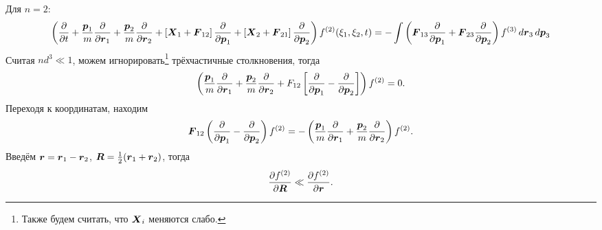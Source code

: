 Для $n=2$:
\begin{equation*}
	\left(
		\frac{\partial }{\partial t} + \frac{\boldsymbol{p}_1}{m} \frac{\partial }{\partial \boldsymbol{r}_1} + \frac{\boldsymbol{p}_2}{m} \frac{\partial }{\partial \boldsymbol{r}_2} + \left[
			\boldsymbol{X}_1 + \boldsymbol{F}_{12}
		\right] \frac{\partial }{\partial \boldsymbol{p}_1} + 
		\left[
			\boldsymbol{X}_2 + \boldsymbol{F}_{21}
		\right] \frac{\partial }{\partial \boldsymbol{p}_2} 
	\right) f^{(2)} (\xi_1, \xi_2, t) =  - \int \left(
		\boldsymbol{F}_{13} \frac{\partial }{\partial \boldsymbol{p}_1} + \boldsymbol{F}_{23} \frac{\partial }{\partial \boldsymbol{p}_2} 
	\right) f^{(3)} \, d \boldsymbol{r}_3 \, d \boldsymbol{p}_3
\end{equation*}
Считая $n d^3 \ll 1$, можем игнорировать\footnote{
	Также будем считать, что $\boldsymbol{X}_i$ меняются слабо. 
}  трёхчастичные столкновения, тогда
\begin{equation*}
	\left(
		\frac{\boldsymbol{p}_1}{m} \frac{\partial }{\partial \boldsymbol{r}_1} + \frac{\boldsymbol{p}_2}{m} \frac{\partial }{\partial \boldsymbol{r}_2} + F_{12} \left[\frac{\partial }{\partial \boldsymbol{p}_1} - \frac{\partial }{\partial \boldsymbol{p}_2} \right]
	\right) f^{(2)} = 0.
\end{equation*}
Переходя к координатам, находим
\begin{equation*}
	\boldsymbol{F}_{12} \left(\frac{\partial }{\partial \boldsymbol{p}_1} - \frac{\partial }{\partial \boldsymbol{p}_2}  \right) f^{(2)} = - \left(
		\frac{\boldsymbol{p}_1}{m} \frac{\partial }{\partial \boldsymbol{r}_1} + \frac{\boldsymbol{p}_2}{m} \frac{\partial }{\partial \boldsymbol{r}_2} 
	\right) f^{(2)}.
\end{equation*}
Введём $\boldsymbol{r} = \boldsymbol{r}_1 - \boldsymbol{r}_2$, $\boldsymbol{R} = \frac{1}{2}(\boldsymbol{r}_1 + \boldsymbol{r}_2)$, тогда
\begin{equation*}
	\frac{\partial f^{(2)}}{\partial \boldsymbol{R}} \ll \frac{\partial f^{(2)}}{\partial \boldsymbol{r}}.
\end{equation*}

